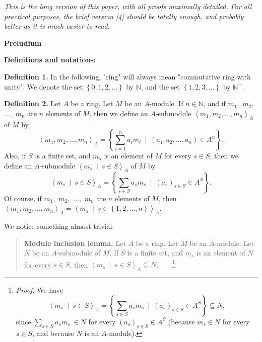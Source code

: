 \documentclass[12pt,final,notitlepage,onecolumn]{article}%
\begin{document}
\textit{This is the long version of this paper, with all proofs maximally
detailed. For all practical purposes, the brief version [4] should be totally
enough, and probably better as it is much easier to read.}

\begin{center}
\color{blue} \textbf{Preludium} \color{black}
\end{center}

\textbf{Definitions and notations:}

\textbf{Definition 1.} In the following, "ring" will always mean "commutative
ring with unity". We denote the set $\left\{  0,1,2,...\right\}  $ by
$\mathbb{N}$, and the set $\left\{  1,2,3,...\right\}  $ by $\mathbb{N}^{+}$.

\textbf{Definition 2.} Let $A$ be a ring. Let $M$ be an $A$-module. If
$n\in\mathbb{N}$, and if $m_{1},$ $m_{2},$ $...,$ $m_{n}$ are $n$ elements of
$M$, then we define an $A$-submodule $\left\langle m_{1},m_{2},...,m_{n}%
\right\rangle _{A}$ of $M$ by%
\[
\left\langle m_{1},m_{2},...,m_{n}\right\rangle _{A}=\left\{  \sum
\limits_{i=1}^{n}a_{i}m_{i}\ \mid\ \left(  a_{1},a_{2},...,a_{n}\right)  \in
A^{n}\right\}  .
\]
Also, if $S$ is a finite set, and $m_{s}$ is an element of $M$ for every $s\in
S$, then we define an $A$-submodule $\left\langle m_{s}\ \mid\ s\in
S\right\rangle _{A}$ of $M$ by%
\[
\left\langle m_{s}\ \mid\ s\in S\right\rangle _{A}=\left\{  \sum\limits_{s\in
S}a_{s}m_{s}\ \mid\ \left(  a_{s}\right)  _{s\in S}\in A^{S}\right\}  .
\]
Of course, if $m_{1},$ $m_{2},$ $...,$ $m_{n}$ are $n$ elements of $M$, then
$\left\langle m_{1},m_{2},...,m_{n}\right\rangle _{A}=\left\langle m_{s}%
\ \mid\ s\in\left\{  1,2,...,n\right\}  \right\rangle _{A}$.

We notice something almost trivial:

\begin{quote}
\textbf{Module inclusion lemma.} Let $A$ be a ring. Let $M$ be an $A$-module.
Let $N$ be an $A$-submodule of $M$. If $S$ is a finite set, and $m_{s}$ is an
element of $N$ for every $s\in S$, then $\left\langle m_{s}\ \mid\ s\in
S\right\rangle _{A}\subseteq N$.\ \ \ \ \footnote{\textit{Proof.} We have%
\[
\left\langle m_{s}\ \mid\ s\in S\right\rangle _{A}=\left\{  \sum\limits_{s\in
S}a_{s}m_{s}\ \mid\ \left(  a_{s}\right)  _{s\in S}\in A^{S}\right\}
\subseteq N,
\]
since $\sum\limits_{s\in S}a_{s}m_{s}\ \in N$ for every $\left(  a_{s}\right)
_{s\in S}\in A^{S}$ (because $m_{s}\in N$ for every $s\in S$, and because $N$
is an $A$-module).}
\end{quote}
\end{document}
